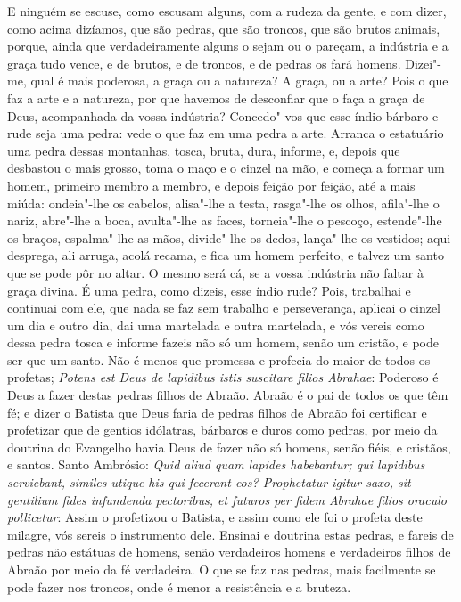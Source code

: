 E ninguém se escuse, como escusam alguns, com a rudeza da gente, e
com dizer, como acima dizíamos, que são pedras, que são troncos, que são
brutos animais, porque, ainda que verdadeiramente alguns o sejam ou o
pareçam, a indústria e a graça tudo vence, e de brutos, e de troncos, e
de pedras os fará homens. Dizei"-me, qual é mais poderosa, a graça ou a
natureza? A graça, ou a arte? Pois o que faz a arte e a natureza, por
que havemos de desconfiar que o faça a graça de Deus, acompanhada da
vossa indústria? Concedo"-vos que esse índio bárbaro e rude seja uma
pedra: vede o que faz em uma pedra a arte. Arranca o estatuário uma
pedra dessas montanhas, tosca, bruta, dura, informe, e, depois que
desbastou o mais grosso, toma o maço e o cinzel na mão, e começa a
formar um homem, primeiro membro a membro, e depois feição por feição,
até a mais miúda: ondeia"-lhe os cabelos, alisa"-lhe a testa, rasga"-lhe os
olhos, afila"-lhe o nariz, abre"-lhe a boca, avulta"-lhe as faces,
torneia"-lhe o pescoço, estende"-lhe os braços, espalma"-lhe as mãos,
divide"-lhe os dedos, lança"-lhe os vestidos; aqui desprega, ali arruga,
acolá recama, e fica um homem perfeito, e talvez um santo que se pode
pôr no altar. O mesmo será cá, se a vossa indústria não faltar à graça
divina. É uma pedra, como dizeis, esse índio rude? Pois, trabalhai e
continuai com ele, que nada se faz sem trabalho e perseverança,
aplicai o cinzel um dia e outro dia, dai uma martelada e outra
martelada, e vós vereis como dessa pedra tosca e informe fazeis não só
um homem, senão um cristão, e pode ser que um santo.
Não é menos que promessa e profecia do maior de todos os profetas;
\emph{Potens est Deus de lapidibus istis suscitare filios Abrahae}: %
 Poderoso é Deus a fazer destas pedras filhos de Abraão.
Abraão é o pai de todos os que têm fé; e dizer o Batista que Deus faria
de pedras filhos de Abraão foi certificar e profetizar que de gentios
idólatras, bárbaros e duros como pedras, por meio da doutrina do
Evangelho havia Deus de fazer não só homens, senão fiéis, e cristãos, e
santos. Santo Ambrósio: \emph{Quid aliud quam lapides habebantur; qui
lapidibus serviebant, similes utique his qui fecerant eos? Prophetatur
igitur saxo, sit gentilium fides infundenda pectoribus, et futuros per
fidem Abrahae filios oraculo pollicetur}: Assim o profetizou o
Batista, e assim como ele foi o profeta
deste milagre, vós sereis o instrumento dele. Ensinai e doutrina estas
pedras, e fareis de pedras não estátuas de homens, senão verdadeiros
homens e verdadeiros filhos de Abraão por meio da fé verdadeira. O que
se faz nas pedras, mais facilmente se pode fazer nos troncos, onde é
menor a resistência e a bruteza.

